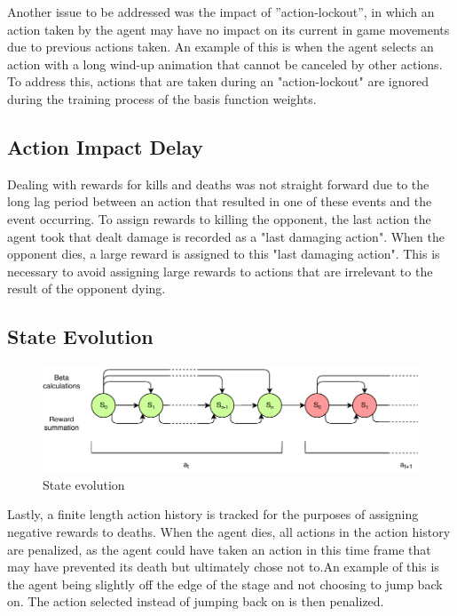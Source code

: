 Another issue to be addressed was the impact of ”action-lockout”, in which an action taken by the agent may have no impact on its current in game movements due to previous actions taken. An example of this is when the agent selects an action with a long wind-up animation that cannot be canceled by other actions. To address this, actions that are taken during an "action-lockout" are ignored during the training process of the basis function weights. 

\subsection{Action Impact Delay}

Dealing with rewards for kills and deaths was not straight forward due to the long lag period between an action that resulted in one of these events and the event occurring. To assign rewards to killing the opponent, the last action the agent took that dealt damage is recorded as a "last damaging action". When the opponent dies, a large reward is assigned to this "last damaging action". This is necessary to avoid assigning large rewards to actions that are irrelevant to the result of the opponent dying.

\subsection{State Evolution}



\begin{figure}[!htb]
	\centering
	\includegraphics[width=120mm]{stateevolution.pdf}
	\caption{State evolution}
\end{figure}

Lastly, a finite length action history is tracked for the purposes of assigning negative rewards to deaths. When the agent dies, all actions in the action history are penalized, as the agent could have taken an action in this time frame that may have prevented its death but ultimately chose not to.An example of this is the agent being slightly off the edge of the stage and not choosing to jump back on. The action selected instead of jumping back on is then penalized.

